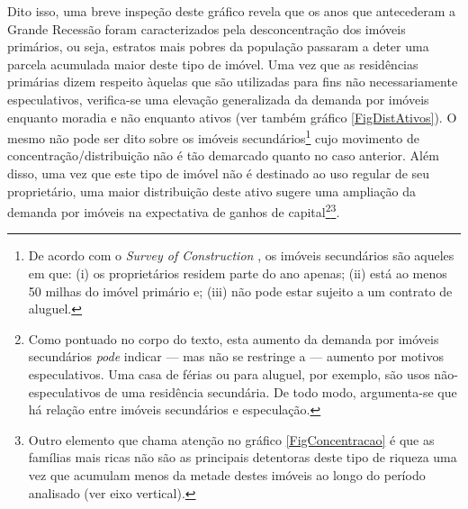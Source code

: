 Dito isso, uma breve inspeção deste gráfico revela que os anos que antecederam a Grande Recessão foram caracterizados pela desconcentração dos imóveis primários, ou seja, estratos mais pobres da população passaram a deter uma parcela acumulada maior deste tipo de imóvel.
Uma vez que as residências primárias dizem respeito àquelas que são utilizadas para fins não necessariamente especulativos, verifica-se uma elevação generalizada da demanda por imóveis enquanto moradia e não enquanto ativos (ver também gráfico \ref{FigDistAtivos}).
O mesmo não pode ser dito sobre os imóveis secundários\footnote{
	De acordo com o \textit{Survey of Construction} \cite{us_census_bureau_characteristics_2017}, os imóveis secundários são aqueles em que: (i) os proprietários residem parte do ano apenas; (ii) está ao menos 50 milhas do imóvel primário e; (iii) não pode estar sujeito a um contrato de aluguel.
} cujo movimento de concentração/distribuição não é tão demarcado quanto no caso anterior.
Além disso, uma vez que este tipo de imóvel não é destinado ao uso regular de seu proprietário, uma maior distribuição deste ativo sugere uma ampliação da demanda por imóveis na expectativa de ganhos de capital\footnote{
	Como pontuado no corpo do texto, esta aumento da demanda por imóveis secundários \textit{pode} indicar --- mas não se restringe a --- aumento por motivos especulativos. Uma casa de férias ou para aluguel, por exemplo, são usos não-especulativos de uma residência secundária.
	De todo modo, argumenta-se que há relação entre imóveis secundários e especulação.
}\footnote{Outro elemento que chama atenção no gráfico \ref{FigConcentracao} é que as famílias mais ricas não são as principais detentoras deste tipo de riqueza uma vez que acumulam menos da metade destes imóveis ao longo do período analisado (ver eixo vertical).}.



